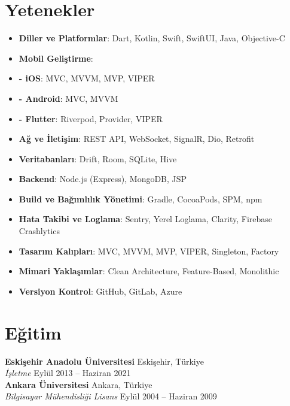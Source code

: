 \documentclass[10pt,a4paper]{extarticle}
\begin{document}
\section{Yetenekler}
\begin{itemize}[leftmargin=*,noitemsep,topsep=0pt]
	\item \textbf{Diller ve Platformlar}: Dart, Kotlin, Swift, SwiftUI, Java, Objective-C
	\item \textbf{Mobil Geliştirme}: 
 	\item \textbf{- iOS}: MVC, MVVM, MVP, VIPER
  	\item \textbf{- Android}: MVC, MVVM
  	\item \textbf{- Flutter}: Riverpod, Provider, VIPER
	\item \textbf{Ağ ve İletişim}: REST API, WebSocket, SignalR, Dio, Retrofit
	\item \textbf{Veritabanları}: Drift, Room, SQLite, Hive
	\item \textbf{Backend}: Node.js (Express), MongoDB, JSP
	\item \textbf{Build ve Bağımlılık Yönetimi}: Gradle, CocoaPods, SPM, npm
	\item \textbf{Hata Takibi ve Loglama}: Sentry, Yerel Loglama, Clarity, Firebase Crashlytics
	\item \textbf{Tasarım Kalıpları}: MVC, MVVM, MVP, VIPER, Singleton, Factory
	\item \textbf{Mimari Yaklaşımlar}: Clean Architecture, Feature-Based, Monolithic
	\item \textbf{Versiyon Kontrol}: GitHub, GitLab, Azure
\end{itemize}
\section{Eğitim}
\textbf{Eskişehir Anadolu Üniversitesi} \hfill Eskişehir, Türkiye\\
\textit{İşletme} \hfill Eylül 2013 -- Haziran 2021\\
\textbf{Ankara Üniversitesi} \hfill Ankara, Türkiye\\
\textit{Bilgisayar Mühendisliği Lisans} \hfill Eylül 2004 -- Haziran 2009\\
\end{document}
